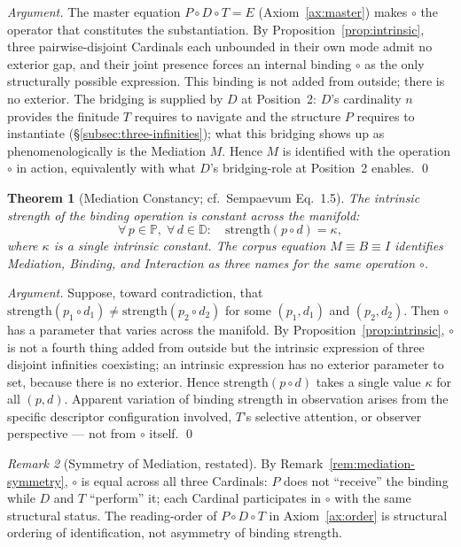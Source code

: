 \documentclass[11pt,a4paper]{article}
\newtheorem{theorem}{Theorem}[section]
\theoremstyle{definition}
\theoremstyle{remark}
\newtheorem{remark}[theorem]{Remark}
\begin{document}
\begin{proof}[Argument]
The master equation $P\circ D\circ T = E$ (Axiom~\ref{ax:master}) makes $\circ$ the operator that constitutes the substantiation. By Proposition~\ref{prop:intrinsic}, three pairwise-disjoint Cardinals each unbounded in their own mode admit no exterior gap, and their joint presence forces an internal binding $\circ$ as the only structurally possible expression. This binding is not added from outside; there is no exterior. The bridging is supplied by $D$ at Position~2: $D$'s cardinality $n$ provides the finitude $T$ requires to navigate and the structure $P$ requires to instantiate (\S\ref{subsec:three-infinities}); what this bridging shows up as phenomenologically is the Mediation $M$. Hence $M$ is identified with the operation $\circ$ in action, equivalently with what $D$'s bridging-role at Position~2 enables. \qed
\end{proof}

\begin{theorem}[Mediation Constancy; cf.\ Sempaevum Eq.~1.5]\label{thm:mediation-constancy}
The intrinsic strength of the binding operation is constant across the manifold:
\[
\forall\, p \in \mathbb{P},\;\forall\, d \in \mathbb{D} :\quad \mathrm{strength}(p \circ d) = \kappa,
\]
where $\kappa$ is a single intrinsic constant. The corpus equation $M \equiv B \equiv I$ identifies Mediation, Binding, and Interaction as three names for the same operation $\circ$.
\end{theorem}

\begin{proof}[Argument]
Suppose, toward contradiction, that $\mathrm{strength}(p_1 \circ d_1) \neq \mathrm{strength}(p_2 \circ d_2)$ for some $(p_1,d_1)$ and $(p_2,d_2)$. Then $\circ$ has a parameter that varies across the manifold. By Proposition~\ref{prop:intrinsic}, $\circ$ is not a fourth thing added from outside but the intrinsic expression of three disjoint infinities coexisting; an intrinsic expression has no exterior parameter to set, because there is no exterior. Hence $\mathrm{strength}(p \circ d)$ takes a single value $\kappa$ for all $(p, d)$. Apparent variation of binding strength in observation arises from the specific descriptor configuration involved, $T$'s selective attention, or observer perspective --- not from $\circ$ itself. \qed
\end{proof}

\begin{remark}[Symmetry of Mediation, restated]\label{rem:M-symmetry-restated}
By Remark~\ref{rem:mediation-symmetry}, $\circ$ is equal across all three Cardinals: $P$ does not ``receive'' the binding while $D$ and $T$ ``perform'' it; each Cardinal participates in $\circ$ with the same structural status. The reading-order of $P\circ D\circ T$ in Axiom~\ref{ax:order} is structural ordering of identification, not asymmetry of binding strength.
\end{remark}
\end{document}
